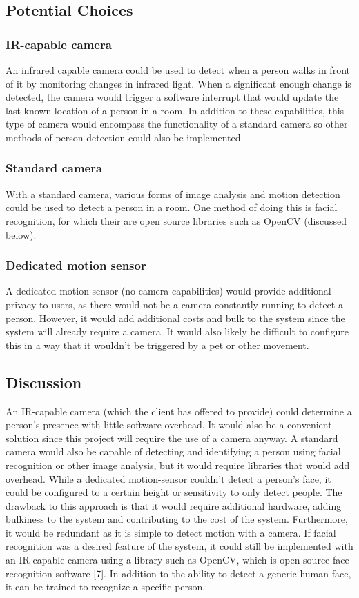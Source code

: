 \documentclass[onecolumn, draftclsnofoot,10pt, compsoc]{IEEEtran}
\begin{document}
\subsection{Potential Choices}
\subsubsection{IR-capable camera}
An infrared capable camera could be used to detect when a person walks in front of it by monitoring changes in infrared light. When a significant enough change is detected, the camera would trigger a software interrupt that would update the last known location of a person in a room. In addition to these capabilities, this type of camera would encompass the functionality of a standard camera so other methods of person detection could also be implemented. 



\subsubsection{Standard camera}
With a standard camera, various forms of image analysis and motion detection could be used to detect a person in a room. One method of doing this is facial recognition, for which their are open source libraries such as OpenCV (discussed below). 


\subsubsection{Dedicated motion sensor}
A dedicated motion sensor (no camera capabilities) would provide additional privacy to users, as there would not be a camera constantly running to detect a person. However, it would add additional costs and bulk to the system since the system will already require a camera. It would also likely be difficult to configure this in a way that it wouldn’t be triggered by a pet or other movement.

\subsection{Discussion}
An IR-capable camera (which the client has offered to provide) could determine a person’s presence with little software overhead. It would also be a convenient solution since this project will require the use of a camera anyway. A standard camera would also be capable of detecting and identifying a person using facial recognition or other image analysis, but it would require libraries that would add overhead. While a dedicated motion-sensor couldn’t detect a person’s face, it could be configured to a certain height or sensitivity to only detect people. The drawback to this approach is that it would require additional hardware, adding bulkiness to the system and contributing to the cost of the system. Furthermore, it would be redundant as it is simple to detect motion with a camera. If facial recognition was a desired feature of the system, it could still be implemented with an IR-capable camera using a library such as OpenCV, which is open source face recognition software [7]. In addition to the ability to detect a generic human face, it can be trained to recognize a specific person.
\end{document}
